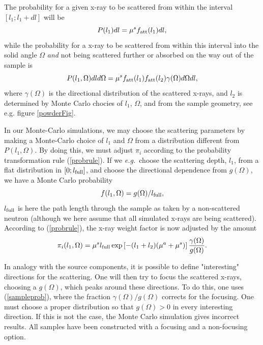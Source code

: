 The probability for a given x-ray to be scattered from within the interval
$[ l_1 ; l_1+dl ]$ will be
\begin{equation}
P(l_1) dl = \mu^s f_{\rm att}(l_1) dl ,
\end{equation}
while the probability for a x-ray to be scattered from within
this interval into the solid angle $\Omega$ {\em and}
not being scattered further
or absorbed on the way out of the sample is
\begin{equation}
P(l_1,\Omega) dl d\Omega =
  \mu^s f_{\rm att}(l_1) f_{\rm att}(l_2) \gamma(\Omega) d\Omega dl ,
\end{equation}
where $\gamma(\Omega)$ is the directional distribution
of the scattered x-rays, and $l_2$ is determined by
Monte Carlo chocies of $l_1$, $\Omega$,
and from the sample geometry, see e.g. figure \ref{powderFig}.

In our Monte-Carlo simulations, we may choose the scattering
parameters by making a Monte-Carlo choice of $l_1$ and $\Omega$
from a distribution different from $P(l_1,\Omega)$.
By doing this, we must adjust $\pi_i$ according to
the probability transformation rule (\ref{probrule}).
If we {\em e.g.}\ choose the scattering depth, $l_1$,
from a flat distribution in $[ 0 ; l_{\rm full} ]$,
and choose the directional dependence from $g(\Omega)$,
we have a Monte Carlo probability
\begin{equation}
f(l_1,\Omega) = g(\Omega) / l_{\rm full} ,
\end{equation}
$l_{\rm full}$ is here the path length through the sample
as taken by a non-scattered neutron (although we here
assume that all simulated x-rays are being scattered).
According to (\ref{probrule}), the x-ray weight factor
is now adjusted by the amount
\begin{equation}     \label{sampleprob}
\pi_i(l_1,\Omega) =
 \mu^s l_{\rm full} \exp \left[ - (l_1+l_2) (\mu^a + \mu^s) \right]
  \frac{\gamma(\Omega)}{g(\Omega)} .
\end{equation}

In analogy with the source components, it is possible to define
"interesting" directions for the scattering.
One will then try to focus the scattered x-rays,
choosing a $g(\Omega)$, which peaks around these directions.
To do this, one uses (\ref{sampleprob}), where the
fraction $\gamma(\Omega)/g(\Omega)$ corrects for the focusing.
One must choose a proper distribution so that
$g(\Omega) > 0$ in every interesting direction. If this is not the
case, the Monte Carlo simulation gives incorrect results.
All samples have been constructed with a focusing
and a non-focusing option.


